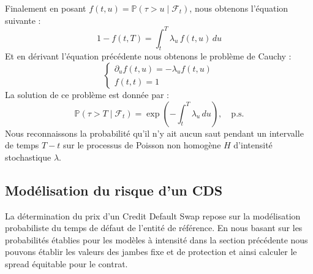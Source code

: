 Finalement en posant $f(t, u) = \mathbb{P}(\tau > u \mid \mathcal{F}_t)$, nous obtenons l'équation suivante :
\begin{equation}
    1 - f(t,T) = \int_t^T \lambda_u \, f(t,u) \, du 
\end{equation}
Et en dérivant l'équation précédente nous obtenons le problème de Cauchy :
\begin{equation}
    \begin{cases}
        \partial_u f(t,u) = - \lambda_u f(t,u) \\
        f(t,t) = 1
    \end{cases}
\end{equation}
La solution de ce problème est donnée par :
\begin{equation}\label{eq:poisson_jump}
    \mathbb{P}(\tau > T \mid \mathcal{F}_t) = \exp\left(- \int_t^T \lambda_u \, du \right), \quad \text{p.s.}
\end{equation}
Nous reconnaissons la probabilité qu'il n'y ait aucun saut pendant un intervalle de temps $T-t$ sur le
processus de Poisson non homogène $H$ d'intensité stochastique $\lambda$.

\subsection{Modélisation du risque d'un CDS}\label{subsec:modele_risque_CDS}

La détermination du prix d'un Credit Default Swap repose sur la modélisation 
probabiliste du temps de défaut de l'entité de référence. En nous basant sur les probabilités
établies pour les modèles à intensité dans la section précédente nous pouvons établir les
valeurs des jambes fixe et de protection et ainsi calculer le spread équitable pour le contrat.

